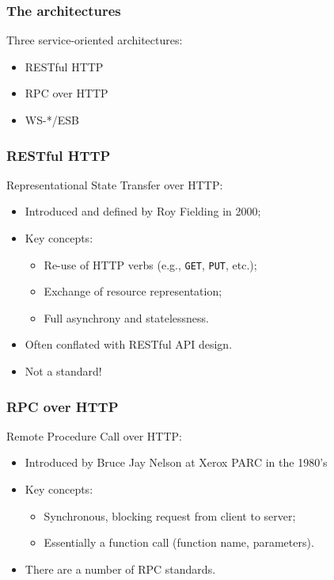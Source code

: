 \documentclass{beamer}
\begin{document}
\begin{frame}
    \frametitle{The architectures}
    Three service-oriented architectures:
    \begin{itemize}
        \item{RESTful HTTP}
        \item{RPC over HTTP}
        \item{WS-*/ESB}
    \end{itemize}
\end{frame}

\begin{frame}
    \frametitle{RESTful HTTP}
    Representational State Transfer over HTTP:
    \begin{itemize}
        \item Introduced and defined by Roy Fielding in 2000;
        \item Key concepts:
        \begin{itemize}
            \item Re-use of HTTP verbs (e.g., \texttt{GET}, \texttt{PUT}, etc.);
            \item Exchange of resource representation;
            \item Full asynchrony and statelessness.
        \end{itemize}
        \item Often conflated with RESTful API design.
        \item Not a standard!
    \end{itemize}
\end{frame}

\begin{frame}
    \frametitle{RPC over HTTP}
    Remote Procedure Call over HTTP:
    \begin{itemize}
        \item Introduced by Bruce Jay Nelson at Xerox PARC in the 1980's
        \item Key concepts:
        \begin{itemize}
            \item Synchronous, blocking request from client to server;
            \item Essentially a function call (function name, parameters).
        \end{itemize}
        \item There are a number of RPC standards.
    \end{itemize}
\end{frame}
\end{document}
